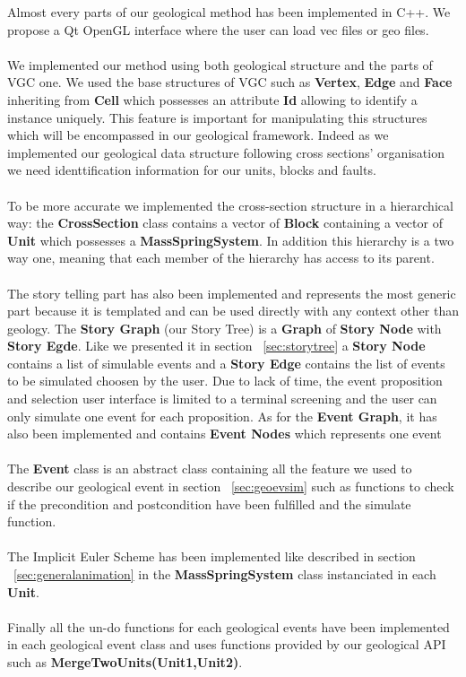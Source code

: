 \documentclass[12pt, a4paper]{report} %
\begin{document}
Almost every parts of our geological method has been implemented in C++. We propose a Qt OpenGL interface where the user can load vec files or geo files.\\\\
We implemented our method using both geological structure and the parts of VGC one. We used the base structures of VGC such as \textbf{Vertex}, \textbf{Edge} and \textbf{Face} inheriting from \textbf{Cell} which possesses an attribute \textbf{Id} allowing to identify a instance uniquely. This feature is important for manipulating this structures which will be encompassed in our geological framework. Indeed as we implemented our geological data structure following cross sections' organisation we need identtification information for our units, blocks and faults.\\\\
To be more accurate we implemented the cross-section structure in a hierarchical way: the \textbf{CrossSection} class contains a vector of \textbf{Block} containing a vector of \textbf{Unit} which possesses a \textbf{MassSpringSystem}. In addition this hierarchy is a two way one, meaning that each member of the hierarchy has access to its parent.\\\\
The story telling part has also been implemented and represents the most generic part because it is templated and can be used directly with any context other than geology. The \textbf{Story Graph} (our Story Tree) is a \textbf{Graph} of \textbf{Story Node} with \textbf{Story Egde}. Like we presented it in section ~\ref{sec:storytree} a \textbf{Story Node} contains a list of simulable events and a \textbf{Story Edge} contains the list of events to be simulated choosen by the user.
Due to lack of time, the event proposition and selection user interface is limited to a terminal screening and the user can only simulate one event for each proposition. As for the \textbf{Event Graph}, it has also been implemented and contains \textbf{Event Nodes} which represents one event\\\\
The \textbf{Event} class is an abstract class containing all the feature we used to describe our geological event in section ~\ref{sec:geoevsim} such as functions to check if the precondition and postcondition have been fulfilled and the simulate function.\\\\
The Implicit Euler Scheme has been implemented like described in section ~\ref{sec:generalanimation} in the \textbf{MassSpringSystem} class instanciated in each \textbf{Unit}.\\\\
Finally all the un-do functions for each geological events have been implemented in each geological event class and uses functions provided by our geological API such as \textbf{MergeTwoUnits(Unit1,Unit2)}. 
\end{document}

